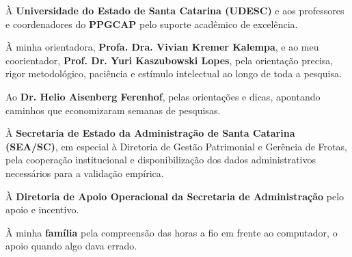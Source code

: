 \begin{agradecimentos}
À \textbf{Universidade do Estado de Santa Catarina (UDESC)} e aos professores e coordenadores do \textbf{PPGCAP} pelo suporte acadêmico de excelência.

À minha orientadora, \textbf{Profa. Dra. Vivian Kremer Kalempa}, e ao meu coorientador, \textbf{Prof. Dr. Yuri Kaszubowski Lopes}, pela orientação precisa, rigor metodológico, paciência e estímulo intelectual ao longo de toda a pesquisa.

Ao \textbf{Dr. Helio Aisenberg Ferenhof}, pelas orientações e dicas, apontando caminhos que economizaram semanas de pesquisas.

À \textbf{Secretaria de Estado da Administração de Santa Catarina (SEA/SC)}, em especial à Diretoria de Gestão Patrimonial e Gerência de Frotas, pela cooperação institucional e disponibilização dos dados administrativos necessários para a validação empírica.

À \textbf{Diretoria de Apoio Operacional da Secretaria de Administração} pelo apoio e incentivo.

À minha \textbf{família} pela compreensão das horas a fio em frente ao computador, o apoio quando algo dava errado.
\end{agradecimentos}
